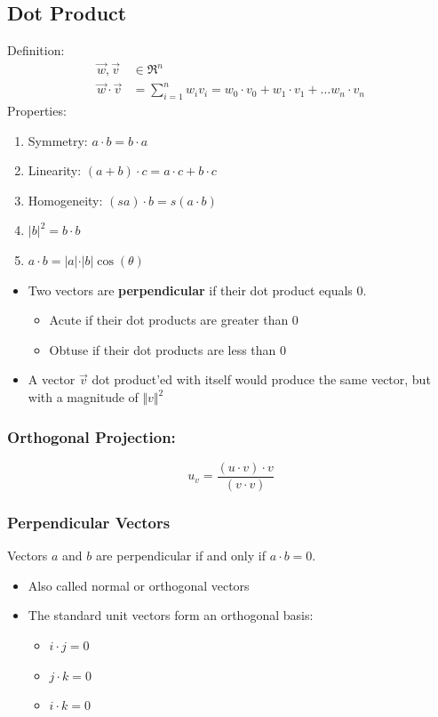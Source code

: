 \documentclass{article}
\begin{document}
\subsection*{Dot Product}
Definition:
\begin{align*}
    \vec w, \vec v &\in \mathfrak{R}^n\\
    \vec w \cdot \vec v &= \sum_{i = 1}^n w_i v_i = w_0 \cdot v_0 + w_1 \cdot v_1 + \dots w_n \cdot v_n
\end{align*}
Properties:
\begin{enumerate}
    \item Symmetry: $a \cdot b = b \cdot a$
    \item Linearity: $(a + b) \cdot c = a \cdot c + b \cdot c$
    \item Homogeneity: $(sa) \cdot b = s(a \cdot b)$
    \item $\vert b \vert^2 = b \cdot b$
    \item $a \cdot b = \vert a \vert \cdot \vert b \vert \cos(\theta)$
\end{enumerate}
\begin{itemize}
    \item Two vectors are \textbf{perpendicular} if their dot product equals 0.
        \begin{itemize}
            \item Acute if their dot products are greater than 0
            \item Obtuse if their dot products are less than 0
        \end{itemize}
    \item A vector $\vec v$ dot product'ed with itself would produce the same vector, but with a magnitude of $\Vert v \Vert^2$
\end{itemize}

\subsubsection*{Orthogonal Projection:}
\[u_v = \frac{(u \cdot v) \cdot v}{ (v \cdot v)}\]

\subsubsection*{Perpendicular Vectors}
Vectors $a$ and $b$ are perpendicular if and only if $a \cdot b = 0$.
\begin{itemize}
    \item Also called normal or orthogonal vectors
    \item The standard unit vectors form an orthogonal basis:
        \begin{itemize}
            \item $i \cdot j = 0$
            \item $j \cdot k = 0$
            \item $i \cdot k = 0$
        \end{itemize}
\end{itemize}
\end{document}
